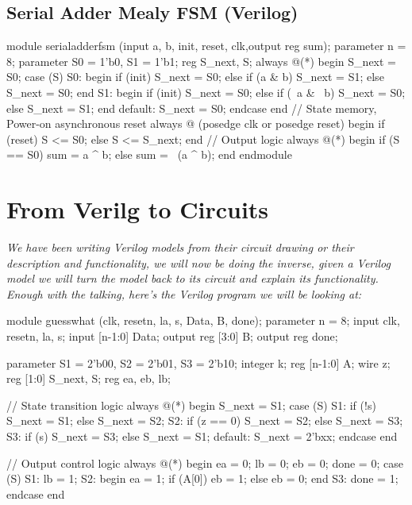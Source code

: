 \documentclass[12pt,openany]{book}
\begin{document}
\subsection{Serial Adder Mealy FSM (Verilog)}
\begin{minipage}[htp]{1\textwidth}
\begin{vhdl}
module serialadderfsm (input a, b, init, reset, clk,output reg sum);
	parameter n = 8;
	parameter S0 = 1'b0, S1 = 1'b1;
	reg S_next, S;
	always @(*) begin
		S_next = S0;
		case (S)
		S0: begin
			if (init) S_next = S0;
			else if (a & b) S_next = S1;
			else S_next = S0;
		end
		S1: begin
			if (init) S_next = S0;
			else if (~a & ~b) S_next = S0;
			else S_next = S1;
		end
		default: S_next = S0;
	endcase
	end	
	// State memory, Power-on asynchronous reset
	always @ (posedge clk or posedge reset) begin
		if (reset) S <= S0;
		else S <= S_next;
	end
	// Output logic
	always @(*) begin
		if (S == S0) sum = a ^ b;
		else sum = ~(a ^ b);
	end
endmodule
\end{vhdl}
\end{minipage}

\section{From Verilg to Circuits}

\textit{We have been writing Verilog models from their circuit drawing or their description and functionality, we will now be doing the inverse, given a Verilog model we will turn the model back to its circuit and explain its functionality.}
\newline
\textit{Enough with the talking, here's the Verilog program we will be looking at:}
\begin{vhdl}
module guesswhat (clk, resetn, la, s, Data, B, done);
parameter n = 8;
input clk, resetn, la, s;
input [n-1:0] Data;
output reg [3:0] B;
output reg done;

parameter S1 = 2'b00, S2 = 2'b01, S3 = 2'b10;
integer k;
reg [n-1:0] A;
wire z;
reg [1:0] S_next, S;
reg ea, eb, lb;

// State transition logic
always @(*) begin
	S_next = S1;
	case (S)
	S1: if (!s) S_next = S1;
		else S_next = S2;
	S2: if (z == 0) S_next = S2;
		else S_next = S3;
	S3: if (s) S_next = S3;
		else S_next = S1;
	default: S_next = 2'bxx;
	endcase
end

// Output control logic
always @(*) begin
	ea = 0;
	lb = 0;
	eb = 0;
	done = 0;
	case (S)
	S1: lb = 1;
	S2: begin
		ea = 1;
		if (A[0]) eb = 1;
		else eb = 0;
	end
	S3: done = 1;
	endcase
end
\end{vhdl}
\end{document}
